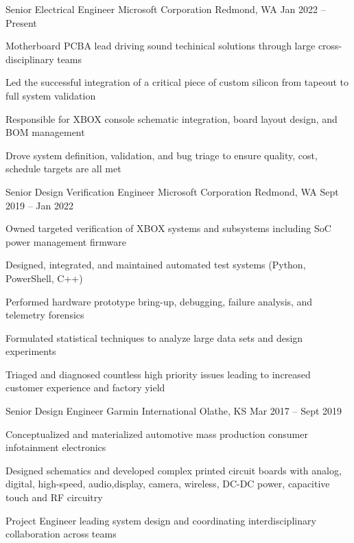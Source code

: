 \documentclass[]{awesome-cv}
\begin{document}
\begin{cventries}
	\cventry
	{Senior Electrical Engineer}
	{Microsoft Corporation}
	{Redmond, WA}
	{Jan 2022 – Present}
	{\begin{cvitems}
		\item {Motherboard PCBA lead driving sound techinical solutions through large cross-disciplinary teams}
		\item {Led the successful integration of a critical piece of custom silicon from tapeout to full system validation}
		\item {Responsible for XBOX console schematic integration, board layout design, and BOM management}
		\item {Drove system definition, validation, and bug triage to ensure quality, cost, schedule targets are all met}
	\end{cvitems}}
	\cventry
	{Senior Design Verification Engineer}
	{Microsoft Corporation}
	{Redmond, WA}
	{Sept 2019 – Jan 2022}
	{\begin{cvitems}
		\item {Owned targeted verification of XBOX systems and subsystems including SoC power management firmware}
		\item {Designed, integrated, and maintained automated test systems (Python, PowerShell, C++)}
		\item {Performed hardware prototype bring-up, debugging, failure analysis, and telemetry forensics}
		\item {Formulated statistical techniques to analyze large data sets and design experiments}
		\item {Triaged and diagnosed countless high priority issues leading to increased customer experience and factory yield}
	\end{cvitems}}
	\cventry
	{Senior Design Engineer}
	{Garmin International}
	{Olathe, KS}
	{Mar 2017 – Sept 2019}
	{\begin{cvitems}
		\item {Conceptualized and materialized automotive mass production consumer infotainment electronics}
		\item {Designed schematics and developed complex printed circuit boards with analog, digital, high-speed, audio,\hfill \break  display, camera, wireless, DC-DC power, capacitive touch and RF circuitry}
		\item {Project Engineer leading system design and coordinating interdisciplinary collaboration across teams}

\end{cvitems}}
\end{cventries}
\end{document}
